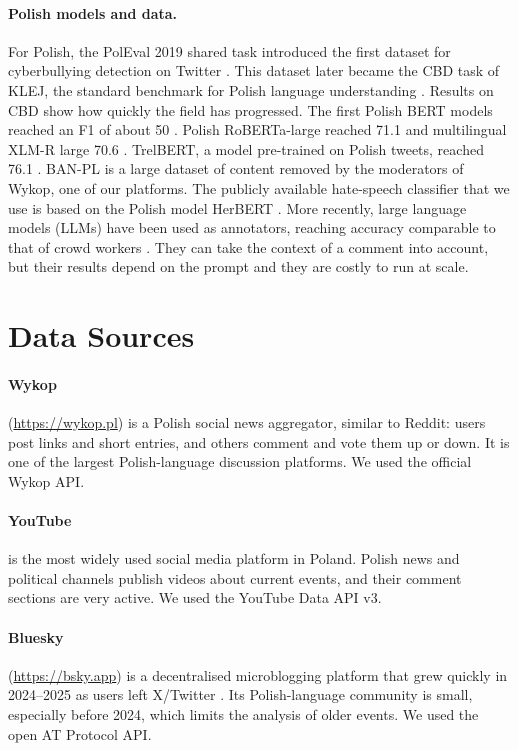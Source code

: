 \documentclass[11pt]{article}
\begin{document}
\paragraph{Polish models and data.} For Polish, the PolEval 2019 shared task introduced the first dataset for cyberbullying detection on Twitter \citep{ptaszynski2019}. This dataset later became the CBD task of KLEJ, the standard benchmark for Polish language understanding \citep{rybak2020klej}. Results on CBD show how quickly the field has progressed. The first Polish BERT models reached an F1 of about 50 \citep{rybak2020klej}. Polish RoBERTa-large reached 71.1 and multilingual XLM-R large 70.6 \citep{dadas2020}. TrelBERT, a model pre-trained on Polish tweets, reached 76.1 \citep{szmyd2023trelbert}. BAN-PL \citep{kolos2024banpl} is a large dataset of content removed by the moderators of Wykop, one of our platforms. The publicly available hate-speech classifier that we use is based on the Polish model HerBERT \citep{mroczkowski2021,kleczek_herbert_hs}. More recently, large language models (LLMs) have been used as annotators, reaching accuracy comparable to that of crowd workers \citep{gilardi2023}. They can take the context of a comment into account, but their results depend on the prompt and they are costly to run at scale.

\section{Data Sources}

\paragraph{Wykop} (\url{https://wykop.pl}) is a Polish social news aggregator, similar to Reddit: users post links and short entries, and others comment and vote them up or down. It is one of the largest Polish-language discussion platforms. We used the official Wykop API.

\paragraph{YouTube} is the most widely used social media platform in Poland. Polish news and political channels publish videos about current events, and their comment sections are very active. We used the YouTube Data API v3.

\paragraph{Bluesky} (\url{https://bsky.app}) is a decentralised microblogging platform that grew quickly in 2024--2025 as users left X/Twitter \citep{seckin2025bluesky}. Its Polish-language community is small, especially before 2024, which limits the analysis of older events. We used the open AT Protocol API.
\end{document}
